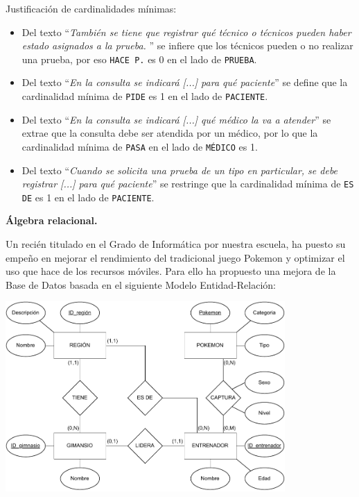 \documentclass[12pt,a4paper,addpoints,answers]{exam}
\begin{document}
\begin{questions}
\begin{solution}
    Justificación de cardinalidades mínimas:
    \begin{itemize}
        \item Del texto ``\textit{También se tiene que registrar qué técnico o técnicos pueden haber estado asignados a la prueba. }'' se infiere que los técnicos pueden o no realizar una prueba, por eso \texttt{HACE P.} es 0 en el lado de \texttt{PRUEBA}.
        \item Del texto ``\textit{En la consulta se indicará [...] para qué paciente}'' se define que la cardinalidad mínima de \texttt{PIDE} es 1 en el lado de \texttt{PACIENTE}.
        \item Del texto ``\textit{En la consulta se indicará [...] qué médico la va a atender}'' se extrae que la consulta debe ser atendida por un médico, por lo que la cardinalidad mínima de \texttt{PASA} en el lado de \texttt{MÉDICO} es 1.
        \item Del texto ``\textit{Cuando se solicita una prueba de un tipo en particular, se debe registrar [...] para qué paciente}'' se restringe que la cardinalidad mínima de \texttt{ES DE} es 1 en el lado de \texttt{PACIENTE}.
    \end{itemize}
\end{solution}

\newpage
\question[1\half] \textbf{Álgebra relacional.}

Un recién titulado en el Grado de Informática por nuestra escuela, ha puesto su empeño en mejorar el rendimiento del tradicional juego Pokemon y optimizar el uso que hace de los recursos móviles. Para ello ha propuesto una mejora de la Base de Datos basada en el siguiente Modelo Entidad-Relación:

\begin{center}
\includegraphics[width=0.8\textwidth]{figs/bbdd-2023-2024-ordinaria/mer-pokemon.pdf}
\end{center}


\end{questions}
\end{document}
